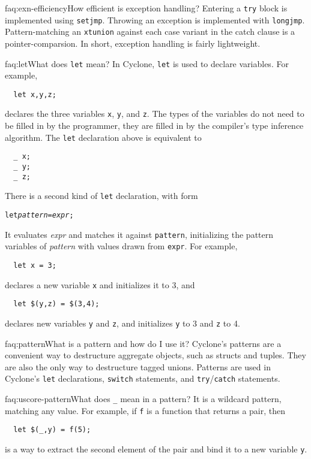 \begin{faqa}{faq:exn-efficiency}{How efficient is exception handling?}
Entering a \texttt{try} block is implemented using \texttt{setjmp}.
Throwing an exception is implemented with \texttt{longjmp}.
Pattern-matching an
\texttt{xtunion} against each case variant in the catch clause is a
pointer-comparsion.  In short, exception handling is fairly
lightweight.
\end{faqa}

\begin{faqa}{faq:let}{What does \texttt{let} mean?}
In Cyclone, \texttt{let} is used to declare variables.  For example,
\begin{verbatim}
  let x,y,z;
\end{verbatim}
declares the three variables \texttt{x}, \texttt{y}, and \texttt{z}.
The types of the variables do not need to be filled in by the
programmer, they are filled in by the compiler's type inference
algorithm.  The \texttt{let} declaration above is equivalent to
\begin{verbatim}
  _ x;
  _ y;
  _ z;
\end{verbatim}

There is a second kind of \texttt{let} declaration, with form
\begin{alltt}
  let {\it pattern} = {\it expr};
\end{alltt}
It evaluates \textit{expr} and matches it against \texttt{pattern},
initializing the pattern variables of \textit{pattern} with values
drawn from \texttt{expr}.  For example,
\begin{verbatim}
  let x = 3;
\end{verbatim}
declares a new variable \texttt{x} and initializes it to 3, and
\begin{verbatim}
  let $(y,z) = $(3,4);
\end{verbatim}
declares new variables \texttt{y} and \texttt{z}, and initializes
\texttt{y} to 3 and \texttt{z} to 4.
\end{faqa}

\begin{faqa}{faq:pattern}{What is a pattern and how do I use it?}
Cyclone's patterns are a convenient way to destructure aggregate
objects, such as structs and tuples.  They are also the only way to
destructure tagged unions.  Patterns are used in Cyclone's
\texttt{let} declarations, \texttt{switch} statements, and
\texttt{try}/\texttt{catch} statements.
\end{faqa}

\begin{faqa}{faq:uscore-pattern}{What does \texttt{_} mean in a pattern?}
It is a wildcard pattern, matching any value.  For example, if
\texttt{f} is a function that returns a pair, then
\begin{verbatim}
  let $(_,y) = f(5); 
\end{verbatim} %
is a way to extract the second element of the pair and bind it to a
new variable \texttt{y}.
\end{faqa}

